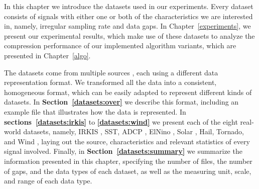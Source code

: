







In this chapter we introduce the datasets used in our experiments. Every dataset consists of signals with either one or both of the characteristics we are interested in, namely, irregular sampling rate and data gaps. In Chapter~\ref{experiments}, we present our experimental results, which make use of these datasets to analyze the compression performance of our implemented algorithm variants, which are presented in Chapter~\ref{algo}.


The datasets come from multiple sources \dataCite, each using a different data representation format. We transformed all the data into a consistent, homogeneous format, which can be easily adapted to represent different kinds of datasets. In \textbf{Section~\ref{datasets:over}} we describe this format, including an example file that illustrates how the data is represented. In \textbf{sections~\ref{datasets:irkis}} to \textbf{\ref{datasets:wind}} we present each of the eight real-world datasets, namely, IRKIS \cite{dataset:irkis}, SST, ADCP \cite{dataset:sst1}, ElNino \cite{dataset:elnino}, Solar \cite{dataset:solar}, Hail, Tornado, and Wind \cite{dataset:spc}, laying out the source, characteristics and relevant statistics of every signal involved. Finally, in \textbf{Section~\ref{datasets:summary}} we summarize the information presented in this chapter, specifying the number of files, the number of gaps, and the data types of each dataset, as well as the measuring unit, scale, and range of each data type.


